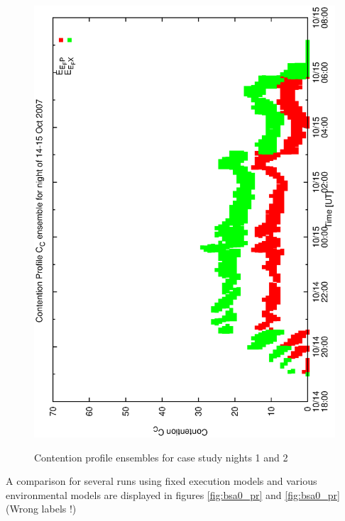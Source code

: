 \begin{figure}[h]
\begin{center}
{    \includegraphics[scale=0.25, angle=-90]{figures/cont6_ensemble.eps}
  }
\caption{Contention profile ensembles for case study nights 1 and 2} 
 \end{center}
\end{figure}

A comparison for several runs using fixed execution models and various environmental models are displayed in figures \ref{fig:bsa0_pr} and \ref{fig:bsa0_pr} (Wrong labels !)


